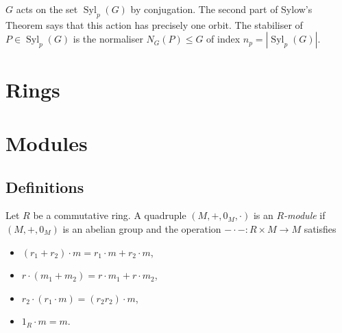 \documentclass[a4paper]{article}
\DeclareMathOperator{\syl}{Syl}
\begin{document}
\(G\) acts on the set \(\syl_p(G)\) by conjugation. The second part of Sylow's Theorem says that this action has precisely one orbit. The stabiliser of \(P \in \syl_p(G)\) is the normaliser \(N_G(P) \leq G\) of index \(n_p = |\syl_p(G)|\).

\blindtext

\section{Rings}

\blindtext

\section{Modules}

\subsection{Definitions}

\begin{definition}[Module]
  Let \(R\) be a commutative ring. A quadruple \((M, +, 0_M, \cdot)\) is an \emph{\(R\)-module} if \((M, +, 0_M)\) is an abelian group and the operation \(- \cdot -: R \times M \to M\) satisfies
  \begin{itemize}
  \item \((r_1 + r_2) \cdot m = r_1 \cdot m + r_2 \cdot m\),
  \item \(r \cdot (m_1 + m_2) = r \cdot m_1 + r \cdot m_2\),
  \item \(r_2 \cdot (r_1 \cdot m) = (r_2r_2) \cdot m\),
  \item \(1_R \cdot m = m\).
  \end{itemize}
\end{definition}
\end{document}
